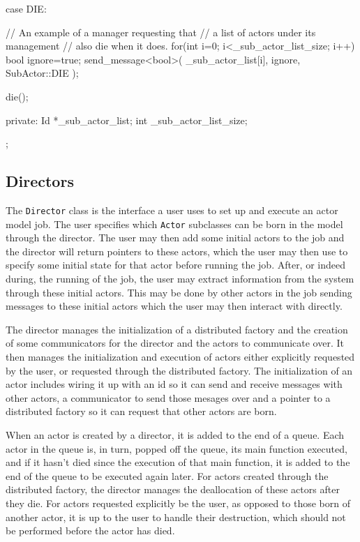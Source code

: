 \documentclass[12pt,a4paper]{article}
\newcommand{\term}[1]{\texttt{#1}}
\begin{document}
\begin{longcode}[caption=Example Actor]
{{{{                case DIE: {

                    // An example of a manager requesting that
                    // a list of actors under its management
                    // also die when it does.
                    for(int i=0; i<_sub_actor_list_size; i++) {
                        bool ignore=true;
                        send_message<bool>(
                            _sub_actor_list[i],
                            ignore,
                            SubActor::DIE
                        );
                    }

                    die();
                }

            }
        }

    }

private:
     Id *_sub_actor_list;
     int _sub_actor_list_size;
};
\end{longcode}


\subsection{Directors}
The \term{Director} class is the interface a user uses to set up
and execute an actor model job.
The user specifies which \term{Actor} subclasses can be born in
the model through the director.
The user may then add some initial actors to the job and the director
will return pointers to these actors, which the user may then use
to specify some initial state for that actor before running the job.
After, or indeed during, the running of the job, the user may extract
information from the system through these initial actors.
This may be done by other actors in the job sending messages to
these initial actors which the user may then interact with directly.

The director manages the initialization of a distributed factory
and the creation of some communicators for the director and the actors
to communicate over.
It then manages the initialization and execution of actors either
explicitly requested by the user, or requested through the distributed
factory.
The initialization of an actor includes wiring it up with an id
so it can send and receive messages with other actors,
a communicator to send those mesages over
and a pointer to a distributed factory so it can request that other
actors are born.

When an actor is created by a director, it is added to the end of a queue.
Each actor in the queue is, in turn, popped off the queue, its main
function executed, and if it hasn't died since the execution of
that main function, it is added to the end of the queue to be executed
again later.
For actors created through the distributed factory, the director
manages the deallocation of these actors after they die.
For actors requested explicitly be the user, as opposed to those
born of another actor, it is up to the user
to handle their destruction, which should not be performed before the actor
has died.
\end{document}
